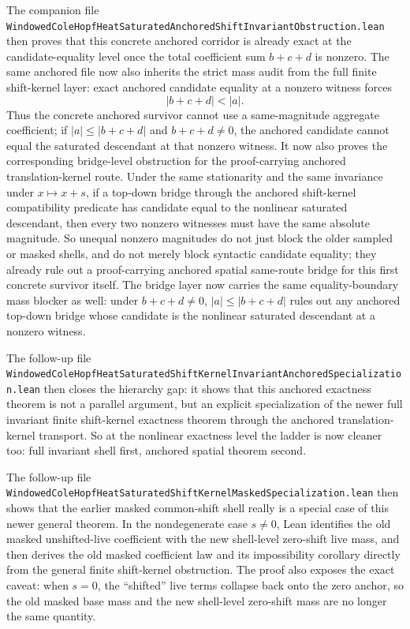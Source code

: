 \documentclass[11pt]{article}
\begin{document}
The companion file
\texttt{WindowedColeHopfHeatSaturatedAnchoredShiftInvariantObstruction.lean}
then proves that this concrete anchored corridor is already exact at the
candidate-equality level once the total coefficient sum \(b+c+d\) is nonzero.
The same anchored file now also inherits the strict mass audit from the full
finite shift-kernel layer: exact anchored candidate equality at a nonzero
witness forces
\[
  |b+c+d| < |a|.
\]
Thus the concrete anchored survivor cannot use a same-magnitude aggregate
coefficient; if \(|a|\le |b+c+d|\) and \(b+c+d\neq 0\), the anchored candidate
cannot equal the saturated descendant at that nonzero witness.
It now also proves the corresponding bridge-level obstruction for the
proof-carrying anchored translation-kernel route.  Under the same stationarity
and the same invariance under \(x \mapsto x+s\), if a top-down bridge through
the anchored shift-kernel compatibility predicate has candidate equal to the
nonlinear saturated descendant, then every two nonzero witnesses must have the
same absolute magnitude.  So unequal nonzero magnitudes do not just block the
older sampled or masked shells, and do not merely block syntactic candidate
equality; they already rule out a proof-carrying anchored spatial same-route
bridge for this first concrete survivor itself.
The bridge layer now carries the same equality-boundary mass blocker as well:
under \(b+c+d\neq0\), \(|a|\le |b+c+d|\) rules out any anchored top-down bridge
whose candidate is the nonlinear saturated descendant at a nonzero witness.

The follow-up file
\texttt{WindowedColeHopfHeatSaturatedShiftKernelInvariantAnchoredSpecialization.lean}
then closes the hierarchy gap: it shows that this anchored exactness theorem is
not a parallel argument, but an explicit specialization of the newer full
invariant finite shift-kernel exactness theorem through the anchored
translation-kernel transport.  So at the nonlinear exactness level the ladder is
now cleaner too: full invariant shell first, anchored spatial theorem second.

The follow-up file
\texttt{WindowedColeHopfHeatSaturatedShiftKernelMaskedSpecialization.lean}
then shows that the earlier masked common-shift shell really is a special case
of this newer general theorem.  In the nondegenerate case \(s \neq 0\), Lean
identifies the old masked unshifted-live coefficient with the new shell-level
zero-shift live mass, and then derives the old masked coefficient law and its
impossibility corollary directly from the general finite shift-kernel
obstruction.  The proof also exposes the exact caveat: when \(s = 0\), the
``shifted'' live terms collapse back onto the zero anchor, so the old masked
base mass and the new shell-level zero-shift mass are no longer the same
quantity.
\end{document}
